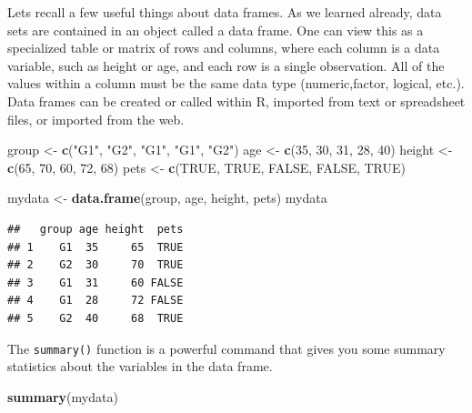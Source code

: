 \documentclass[
]{book}
\newenvironment{Shaded}{\begin{snugshade}}{\end{snugshade}}
\newcommand{\DecValTok}[1]{\textcolor[rgb]{0.00,0.00,0.81}{#1}}
\newcommand{\KeywordTok}[1]{\textcolor[rgb]{0.13,0.29,0.53}{\textbf{#1}}}
\newcommand{\NormalTok}[1]{#1}
\newcommand{\OtherTok}[1]{\textcolor[rgb]{0.56,0.35,0.01}{#1}}
\newcommand{\StringTok}[1]{\textcolor[rgb]{0.31,0.60,0.02}{#1}}
\begin{document}
Lets recall a few useful things about data frames. As we learned already, data sets are contained in an object called a data frame. One can view this as a specialized table or matrix of rows and columns, where each column is a data variable, such as height or age, and each row is a single observation. All of the values within a column must be the same data type (numeric,factor, logical, etc.). Data frames can be created or called within R, imported from text or spreadsheet files, or imported from the web.

\begin{Shaded}
\begin{Highlighting}[]
\NormalTok{group <-}\StringTok{ }\KeywordTok{c}\NormalTok{(}\StringTok{"G1"}\NormalTok{, }\StringTok{"G2"}\NormalTok{, }\StringTok{"G1"}\NormalTok{, }\StringTok{"G1"}\NormalTok{, }\StringTok{"G2"}\NormalTok{)}
\NormalTok{age <-}\StringTok{ }\KeywordTok{c}\NormalTok{(}\DecValTok{35}\NormalTok{, }\DecValTok{30}\NormalTok{, }\DecValTok{31}\NormalTok{, }\DecValTok{28}\NormalTok{, }\DecValTok{40}\NormalTok{)}
\NormalTok{height <-}\StringTok{ }\KeywordTok{c}\NormalTok{(}\DecValTok{65}\NormalTok{, }\DecValTok{70}\NormalTok{, }\DecValTok{60}\NormalTok{, }\DecValTok{72}\NormalTok{, }\DecValTok{68}\NormalTok{)}
\NormalTok{pets <-}\StringTok{ }\KeywordTok{c}\NormalTok{(}\OtherTok{TRUE}\NormalTok{, }\OtherTok{TRUE}\NormalTok{, }\OtherTok{FALSE}\NormalTok{, }\OtherTok{FALSE}\NormalTok{, }\OtherTok{TRUE}\NormalTok{)}

\NormalTok{mydata <-}\StringTok{ }\KeywordTok{data.frame}\NormalTok{(group, age, height, pets)}
\NormalTok{mydata}
\end{Highlighting}
\end{Shaded}

\begin{verbatim}
##   group age height  pets
## 1    G1  35     65  TRUE
## 2    G2  30     70  TRUE
## 3    G1  31     60 FALSE
## 4    G1  28     72 FALSE
## 5    G2  40     68  TRUE
\end{verbatim}

The \texttt{summary()} function is a powerful command that gives you some summary statistics about the variables in the data frame.

\begin{Shaded}
\begin{Highlighting}[]
\KeywordTok{summary}\NormalTok{(mydata)}
\end{Highlighting}
\end{Shaded}
\end{document}
